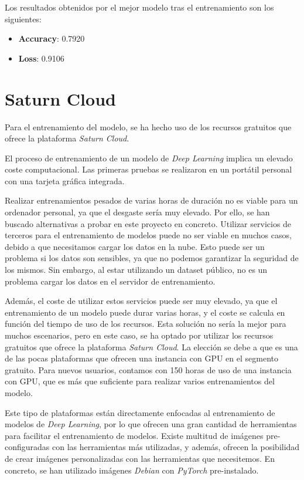 Los resultados obtenidos por el mejor modelo tras el entrenamiento son los siguientes:
\begin{itemize}
    \item \textbf{Accuracy}: 0.7920
    \item \textbf{Loss}: 0.9106
\end{itemize} 


\section{Saturn Cloud}\label{seccion:saturn-cloud}
Para el entrenamiento del modelo, se ha hecho uso de los recursos gratuitos que ofrece la plataforma \textit{Saturn Cloud}.

El proceso de entrenamiento de un modelo de \textit{Deep Learning} implica un elevado coste computacional.
Las primeras pruebas se realizaron en un portátil personal con una tarjeta gráfica integrada.

Realizar entrenamientos pesados de varias horas de duración no es viable para un ordenador personal, ya que el desgaste sería muy elevado.
Por ello, se han buscado alternativas a probar en este proyecto en concreto.
Utilizar servicios de terceros para el entrenamiento de modelos puede no ser viable en muchos casos, debido a que necesitamos cargar los datos en la nube.
Esto puede ser un problema si los datos son sensibles, ya que no podemos garantizar la seguridad de los mismos.
Sin embargo, al estar utilizando un dataset público, no es un problema cargar los datos en el servidor de entrenamiento.

Además, el coste de utilizar estos servicios puede ser muy elevado, ya que el entrenamiento de un modelo puede durar varias horas, y el coste se calcula en función del tiempo de uso de los recursos.
Esta solución no sería la mejor para muchos escenarios, pero en este caso, se ha optado por utilizar los recursos gratuitos que ofrece la plataforma \textit{Saturn Cloud}.
La elección se debe a que es una de las pocas plataformas que ofrecen una instancia con GPU en el segmento gratuito.
Para nuevos usuarios, contamos con 150 horas de uso de una instancia con GPU, que es más que suficiente para realizar varios entrenamientos del modelo.

Este tipo de plataformas están directamente enfocadas al entrenamiento de modelos de \textit{Deep Learning}, por lo que ofrecen una gran cantidad de herramientas para facilitar el entrenamiento de modelos.
Existe multitud de imágenes pre-configuradas con las herramientas más utilizadas, y además, ofrecen la posibilidad de crear imágenes personalizadas con las herramientas que necesitemos.
En concreto, se han utilizado imágenes \textit{Debian} con \textit{PyTorch} pre-instalado.


